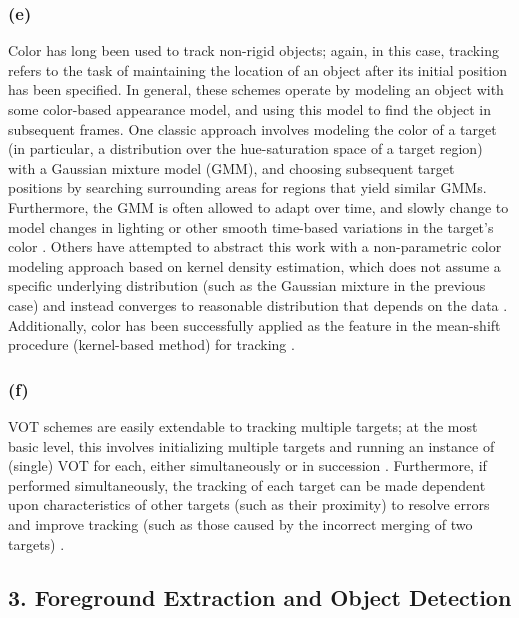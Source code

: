 \documentclass{article}
\begin{document}
\subsubsection*{(e)}
Color has long been used to track non-rigid objects; again, in this case, tracking refers to the task of maintaining the location of an object after its initial position has been specified. In general, these schemes operate by modeling an object with some color-based appearance model, and using this model to find the object in subsequent frames. One classic approach involves modeling the color of a target (in particular, a distribution over the hue-saturation space of a target region) with a Gaussian mixture model (GMM), and choosing subsequent target positions by searching surrounding areas for regions that yield similar GMMs. Furthermore, the GMM is often allowed to adapt over time, and slowly change to model changes in lighting or other smooth time-based variations in the target's color \citep{raja_1998, mckenna_1999, jepson_2003}. Others have attempted to abstract this work with a non-parametric color modeling approach based on kernel density estimation, which does not assume a specific underlying distribution (such as the Gaussian mixture in the previous case) and instead converges to reasonable distribution that depends on the data \citep{elgammal_2001}. Additionally, color has been successfully applied as the feature in the mean-shift procedure (kernel-based method) for tracking \citep{comaniciu_2003, perez_2002, nummiaro_2003, lee_2011}.

\subsubsection*{(f)}
VOT schemes are easily extendable to tracking multiple targets; at the most basic level, this involves initializing multiple targets and running an instance of (single) VOT for each, either simultaneously or in succession \citep{perez_2002}. Furthermore, if performed simultaneously, the tracking of each target can be made dependent upon characteristics of other targets (such as their proximity) to resolve errors and improve tracking (such as those caused by the incorrect merging of two targets) \citep{khan_2004, vermaak_2003} . 




\subsection*{3. Foreground Extraction and Object Detection}
\end{document}
